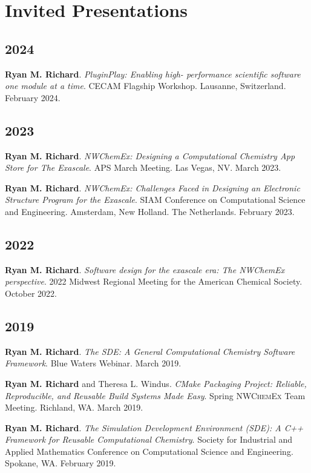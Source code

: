 \documentclass[11pt,a4paper,sans]{moderncv}
\begin{document}
\section{Invited Presentations}
\vspace{5pt}
\begin{etaremune}
    \item[]{}
	\subsection{2024}
	\item{\textbf{Ryan M. Richard}. \textit{PluginPlay: Enabling high-
	      performance scientific software one module at a time}. CECAM Flagship 
		  Workshop. Lausanne, Switzerland. February 2024.}

	\subsection{2023}
	\item{\textbf{Ryan M. Richard}. \textit{NWChemEx: Designing a Computational
	      Chemistry App Store for The Exascale}. APS March Meeting. Las Vegas,
		  NV. March 2023.}
	\item{\textbf{Ryan M. Richard}. \textit{NWChemEx: Challenges Faced in
	      Designing an Electronic Structure Program for the Exascale}. SIAM
		  Conference on Computational Science and Engineering. Amsterdam, New
		  Holland. The Netherlands. February 2023.}

	\subsection{2022}
    \item{\textbf{Ryan M. Richard}. \textit{Software design for the exascale
	      era: The NWChemEx perspective}. 2022 Midwest Regional Meeting for the
		  American Chemical Society. October 2022.}

	\subsection{2019}
	\item{\textbf{Ryan M. Richard}. \textit{The SDE: A General Computational
	      Chemistry Software Framework}. Blue Waters Webinar. March 2019.}
	\item{\textbf{Ryan M. Richard} and Theresa L. Windus. \textit{CMake
	      Packaging Project: Reliable, Reproducible, and Reusable Build Systems
		  Made Easy}. Spring \textsc{NWChemEx} Team Meeting. Richland, WA.
		  March 2019.}
	\item{\textbf{Ryan M. Richard}. \textit{The Simulation Development
	      Environment (SDE): A C++ Framework for Reusable Computational
		  Chemistry}. Society for Industrial and Applied Mathematics Conference
		  on Computational Science and Engineering. Spokane, WA. February 2019.}


\end{etaremune}
\end{document}
